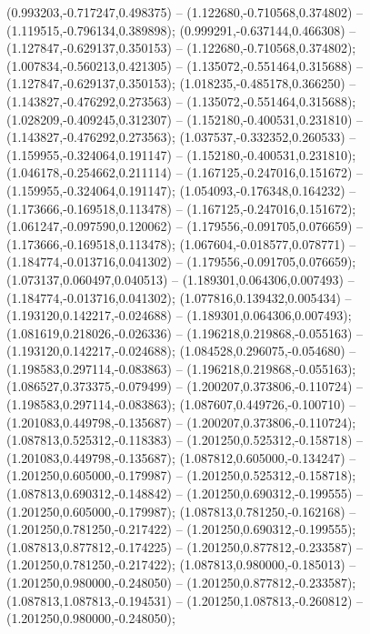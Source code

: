  (0.993203,-0.717247,0.498375) -- (1.122680,-0.710568,0.374802) -- (1.119515,-0.796134,0.389898);
 (0.999291,-0.637144,0.466308) -- (1.127847,-0.629137,0.350153) -- (1.122680,-0.710568,0.374802);
 (1.007834,-0.560213,0.421305) -- (1.135072,-0.551464,0.315688) -- (1.127847,-0.629137,0.350153);
 (1.018235,-0.485178,0.366250) -- (1.143827,-0.476292,0.273563) -- (1.135072,-0.551464,0.315688);
 (1.028209,-0.409245,0.312307) -- (1.152180,-0.400531,0.231810) -- (1.143827,-0.476292,0.273563);
 (1.037537,-0.332352,0.260533) -- (1.159955,-0.324064,0.191147) -- (1.152180,-0.400531,0.231810);
 (1.046178,-0.254662,0.211114) -- (1.167125,-0.247016,0.151672) -- (1.159955,-0.324064,0.191147);
 (1.054093,-0.176348,0.164232) -- (1.173666,-0.169518,0.113478) -- (1.167125,-0.247016,0.151672);
 (1.061247,-0.097590,0.120062) -- (1.179556,-0.091705,0.076659) -- (1.173666,-0.169518,0.113478);
 (1.067604,-0.018577,0.078771) -- (1.184774,-0.013716,0.041302) -- (1.179556,-0.091705,0.076659);
 (1.073137,0.060497,0.040513) -- (1.189301,0.064306,0.007493) -- (1.184774,-0.013716,0.041302);
 (1.077816,0.139432,0.005434) -- (1.193120,0.142217,-0.024688) -- (1.189301,0.064306,0.007493);
 (1.081619,0.218026,-0.026336) -- (1.196218,0.219868,-0.055163) -- (1.193120,0.142217,-0.024688);
 (1.084528,0.296075,-0.054680) -- (1.198583,0.297114,-0.083863) -- (1.196218,0.219868,-0.055163);
 (1.086527,0.373375,-0.079499) -- (1.200207,0.373806,-0.110724) -- (1.198583,0.297114,-0.083863);
 (1.087607,0.449726,-0.100710) -- (1.201083,0.449798,-0.135687) -- (1.200207,0.373806,-0.110724);
 (1.087813,0.525312,-0.118383) -- (1.201250,0.525312,-0.158718) -- (1.201083,0.449798,-0.135687);
 (1.087812,0.605000,-0.134247) -- (1.201250,0.605000,-0.179987) -- (1.201250,0.525312,-0.158718);
 (1.087813,0.690312,-0.148842) -- (1.201250,0.690312,-0.199555) -- (1.201250,0.605000,-0.179987);
 (1.087813,0.781250,-0.162168) -- (1.201250,0.781250,-0.217422) -- (1.201250,0.690312,-0.199555);
 (1.087813,0.877812,-0.174225) -- (1.201250,0.877812,-0.233587) -- (1.201250,0.781250,-0.217422);
 (1.087813,0.980000,-0.185013) -- (1.201250,0.980000,-0.248050) -- (1.201250,0.877812,-0.233587);
 (1.087813,1.087813,-0.194531) -- (1.201250,1.087813,-0.260812) -- (1.201250,0.980000,-0.248050);
